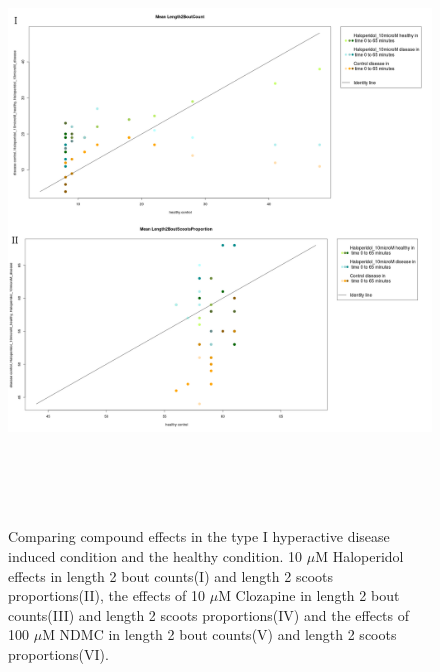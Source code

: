 \newpage
\begin{figure}[h!]
\begin{center}
\caption{Comparing compound effects in the type I hyperactive disease induced condition and the healthy condition. 10 $\mu$M Haloperidol effects in length 2 bout counts(I) and length 2 scoots proportions(II), the effects of 10 $\mu$M Clozapine in length 2 bout counts(III) and length 2 scoots proportions(IV) and the effects of 100 $\mu$M NDMC in length 2 bout counts(V) and length 2 scoots proportions(VI).}
\includegraphics[width=15cm,height=16cm]{ApoHighCountScootsH.png}
\end{center}
\end{figure}
\newpage
